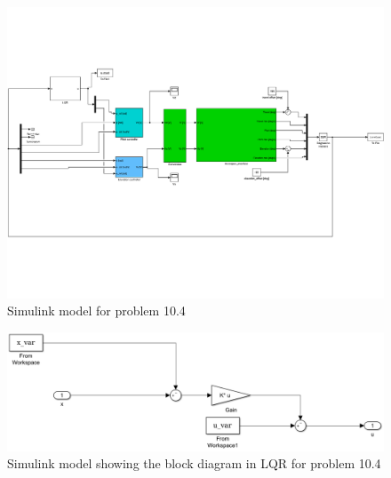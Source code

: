 \begin{figure}[H]
    \centering
    \includegraphics[scale=0.5]{data_10.4/simulink.pdf}
    \caption{Simulink model for problem 10.4}
    \label{fig:10_4_simulink}
\end{figure}
\begin{figure}[H]
    \centering
    \includegraphics[width=1\linewidth]{data_10.4/simmodel_lqr.PNG}
    \caption{Simulink model showing the block diagram in LQR for problem 10.4}
    \label{fig:10_4_simulink_lqr}
\end{figure}
